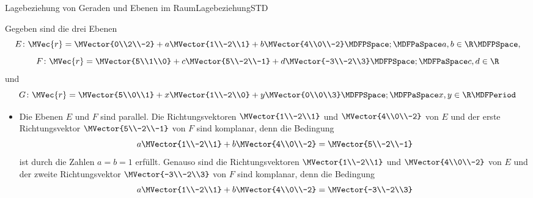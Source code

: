 \begin{MXContent}{Lagebeziehung von Geraden und Ebenen im Raum}{Lagebeziehung}{STD}
\begin{MExample}
Gegeben sind die drei Ebenen
\[
 E\colon\MVec{r}=\MVector{0\\2\\-2}+a\MVector{1\\-2\\1}+b\MVector{4\\0\\-2}\MDFPSpace;\MDFPaSpace a,b\in\R\MDFPSpace,
\]
\[
 F\colon\MVec{r}=\MVector{5\\1\\0}+c\MVector{5\\-2\\-1}+d\MVector{-3\\-2\\3}\MDFPSpace;\MDFPaSpace c,d\in\R
\]
und
\[
 G\colon\MVec{r}=\MVector{5\\0\\1}+x\MVector{1\\-2\\0}+y\MVector{0\\0\\3}\MDFPSpace;\MDFPaSpace x,y\in\R \MDFPeriod
\]
\begin{itemize}
 \item Die Ebenen $E$ und $F$ sind parallel. Die Richtungsvektoren $\MVector{1\\-2\\1}$ und $\MVector{4\\0\\-2}$ von $E$ und der erste Richtungsvektor $\MVector{5\\-2\\-1}$ von $F$ sind komplanar, denn die Bedingung
 \[
  a\MVector{1\\-2\\1}+b\MVector{4\\0\\-2}=\MVector{5\\-2\\-1}
 \]
 ist durch die Zahlen $a=b=1$ erfüllt. Genauso sind die Richtungsvektoren $\MVector{1\\-2\\1}$ und $\MVector{4\\0\\-2}$ von $E$ und der zweite Richtungsvektor $\MVector{-3\\-2\\3}$ von $F$ sind komplanar, denn die Bedingung
 \[
  a\MVector{1\\-2\\1}+b\MVector{4\\0\\-2}=\MVector{-3\\-2\\3}
\]
\end{itemize}
\end{MExample}
\end{MXContent}
